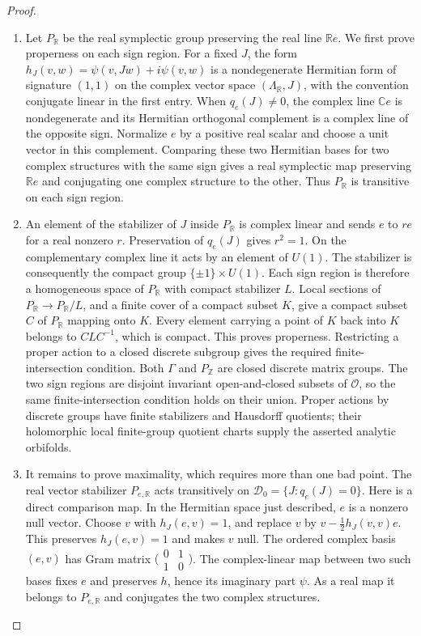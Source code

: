 \begin{proof}
\begin{enumerate}[label=\arabic*.,leftmargin=*]
\item Let $P_{\mathbb R}$ be the real symplectic group preserving the real line
$\mathbb Re$.  We first prove properness on each sign region.  For a fixed
$J$, the form
$h_J(v,w)=\psi(v,Jw)+i\psi(v,w)$ is a nondegenerate Hermitian form of
signature $(1,1)$ on the complex vector space $(\Lambda_{\mathbb R},J)$,
with the convention conjugate linear in the first entry.  When
$q_e(J)\ne0$, the complex line $\mathbb Ce$ is nondegenerate and its
Hermitian orthogonal complement is a complex line of the opposite sign.
Normalize $e$ by a positive real scalar and choose a unit vector in this
complement.  Comparing these two Hermitian bases for two complex
structures with the same sign gives a real symplectic map preserving
$\mathbb Re$ and conjugating one complex structure to the other.  Thus
$P_{\mathbb R}$ is transitive on each sign region.

\item An element of the stabilizer of $J$ inside $P_{\mathbb R}$ is complex
linear and sends $e$ to $r e$ for a real nonzero $r$.  Preservation of
$q_e(J)$ gives $r^2=1$.  On the complementary complex line it acts by an
element of $U(1)$.  The stabilizer is consequently the compact group
$\{\pm1\}\times U(1)$.  Each sign region is therefore a homogeneous
space of $P_{\mathbb R}$ with compact stabilizer $L$.  Local sections of
$P_{\mathbb R}\to P_{\mathbb R}/L$, and a finite cover of a compact
subset $K$, give a compact subset $C$ of $P_{\mathbb R}$ mapping onto
$K$.  Every element carrying a point of $K$ back into $K$ belongs to
$CLC^{-1}$, which is compact.  This proves properness.  Restricting a
proper action to a closed discrete subgroup gives
the required finite-intersection condition.  Both $\Gamma$ and
$P_{\mathbb Z}$ are closed discrete matrix groups.  The two sign regions
are disjoint invariant open-and-closed subsets of $\mathcal O$, so the
same finite-intersection condition holds on their union.  Proper actions
by discrete groups have finite stabilizers and Hausdorff quotients; their
holomorphic local finite-group quotient charts supply the asserted
analytic orbifolds.

\item It remains to prove maximality, which requires more than one bad point.
The real vector stabilizer $P_{e,\mathbb R}$ acts transitively on
$\mathcal D_0=\{J:q_e(J)=0\}$.  Here is a direct comparison map.  In the
Hermitian space just described, $e$ is a nonzero null vector.  Choose
$v$ with $h_J(e,v)=1$, and replace $v$ by
$v-\tfrac12h_J(v,v)e$.  This preserves $h_J(e,v)=1$ and makes $v$ null.
The ordered complex basis $(e,v)$ has Gram matrix
$\bigl(\begin{smallmatrix}0&1\\1&0\end{smallmatrix}\bigr)$.
The complex-linear map between two such bases fixes $e$ and preserves
$h$, hence its imaginary part $\psi$.  As a real map it belongs to
$P_{e,\mathbb R}$ and conjugates the two complex structures.


\end{enumerate}
\end{proof}
